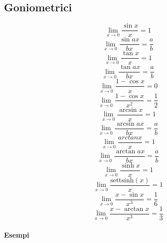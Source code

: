 \subsection{Goniometrici}
\begin{multicols}{2}
\begin{equation}
	\lim_{x\to0}\frac{\sin x}{x}=1
\end{equation}
\begin{equation}
	\lim_{x\to0}\frac{\sin ax}{bx}=\frac{a}{b}
\end{equation}
\begin{equation}
	\lim_{x\to0}\frac{\tan x}{x}=1
\end{equation}
\begin{equation}
	\lim_{x\to0}\frac{\tan ax}{bx}=\frac{a}{b}
\end{equation}
\begin{equation}
	\lim_{x\to0}\frac{1-\cos x}{x}=0
\end{equation}
\begin{equation}
	\lim_{x\to0}\frac{1-\cos x}{x^2}=\frac{1}{2}
\end{equation}
\begin{equation}
	\lim_{x\to0}\frac{\arcsin x}{x}=1
\end{equation}
\begin{equation}
	\lim_{x\to0}\frac{\arcsin ax}{bx}=\frac{a}{b}
\end{equation}
\begin{equation}
	\lim_{x\to0}\frac{arctan x}{x}=1
\end{equation}
\begin{equation}
	\lim_{x\to0}\frac{\arctan ax}{bx}=\frac{a}{b}
\end{equation}
\begin{equation}
	\lim_{x\to0}\frac{\sinh x}{x}=1
\end{equation}
\begin{equation}
	\lim_{x\to0}\frac{\mbox{settsinh}(x)}{x}=1
\end{equation}
\begin{equation}
	\lim_{x\to0}\frac{x-\sin x}{x^3}=\frac{1}{6}
\end{equation}
\begin{equation}
	\lim_{x\to0}\frac{x-\arctan x}{x^3}=\frac{1}{3}
\end{equation}

\end{multicols}
\paragraph{Esempi}

